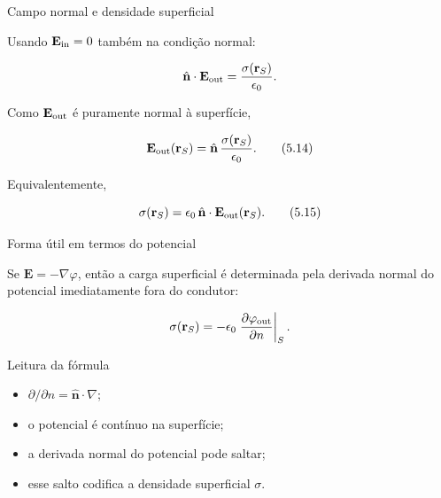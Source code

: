 \documentclass[aspectratio=169]{beamer}
\begin{document}
\begin{frame}{Campo normal e densidade superficial}

\small

Usando \(\mathbf E_{\rm in}=0\) também na condição normal:

\[
\hat{\mathbf n}\cdot \mathbf E_{\rm out}
=
\frac{\sigma(\mathbf r_S)}{\epsilon_0}.
\]

Como \(\mathbf E_{\rm out}\) é puramente normal à superfície,

\begin{eqbox}
\begin{equation}
\mathbf E_{\rm out}(\mathbf r_S)
=
\hat{\mathbf n}\,
\frac{\sigma(\mathbf r_S)}{\epsilon_0}.
\tag{5.14}
\label{eq:campo-fora-condutor-normal}
\end{equation}
\end{eqbox}

Equivalentemente,

\begin{eqbox}
\begin{equation}
\sigma(\mathbf r_S)
=
\epsilon_0\,\hat{\mathbf n}\cdot
\mathbf E_{\rm out}(\mathbf r_S).
\tag{5.15}
\label{eq:sigma-campo-normal}
\end{equation}
\end{eqbox}

\end{frame}

\begin{frame}{Forma útil em termos do potencial}

\small

Se \(\mathbf E=-\nabla\varphi\), então a carga superficial é determinada pela
derivada normal do potencial imediatamente fora do condutor:

\begin{eqbox}
\begin{equation}
\sigma(\mathbf r_S)
=
-\epsilon_0
\left.
\frac{\partial \varphi_{\rm out}}{\partial n}
\right|_S .
\label{eq:sigma-derivada-normal}
\end{equation}
\end{eqbox}

\begin{mybox}{Leitura da fórmula}
\begin{itemize}
\item \(\partial/\partial n=\hat{\mathbf n}\cdot\nabla\);
\item o potencial é contínuo na superfície;
\item a derivada normal do potencial pode saltar;
\item esse salto codifica a densidade superficial \(\sigma\).
\end{itemize}
\end{mybox}

\end{frame}
\end{document}

